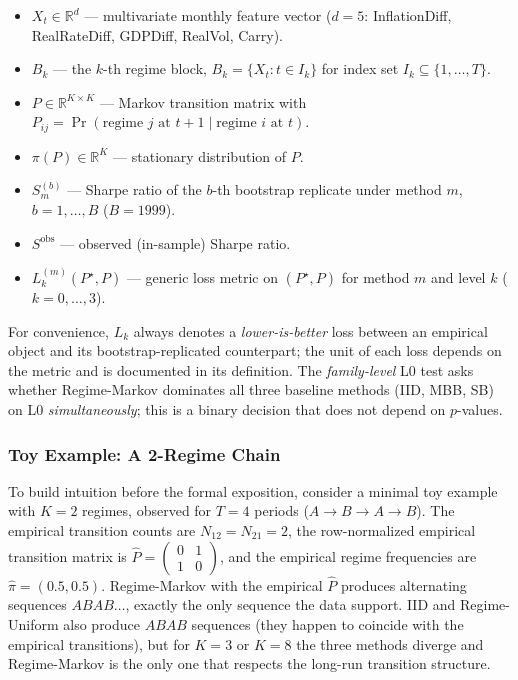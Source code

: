 \documentclass[11pt,a4paper]{article}
\theoremstyle{definition}
\begin{document}
\begin{itemize}[leftmargin=2em]
  \item $X_t \in \mathbb{R}^d$ --- multivariate monthly feature vector
        ($d=5$: InflationDiff, RealRateDiff, GDPDiff, RealVol, Carry).
  \item $B_k$ --- the $k$-th regime block, $B_k = \{X_t : t \in I_k\}$
        for index set $I_k \subseteq \{1, \ldots, T\}$.
  \item $P \in \mathbb{R}^{K \times K}$ --- Markov transition matrix
        with $P_{ij} = \Pr(\text{regime } j \text{ at } t+1 \mid \text{regime } i \text{ at } t)$.
  \item $\pi(P) \in \mathbb{R}^K$ --- stationary distribution of $P$.
  \item $S_m^{(b)}$ --- Sharpe ratio of the $b$-th bootstrap replicate
        under method $m$, $b = 1, \ldots, B$ ($B = 1999$).
  \item $S^{\text{obs}}$ --- observed (in-sample) Sharpe ratio.
  \item $L_k^{(m)}(P^{\star}, P)$ --- generic loss metric on
        $(P^{\star}, P)$ for method $m$ and level $k$ ($k = 0, \ldots, 3$).
\end{itemize}

For convenience, $L_k$ always denotes a \emph{lower-is-better} loss
between an empirical object and its bootstrap-replicated counterpart;
the unit of each loss depends on the metric and is documented in
its definition. The \emph{family-level} L0 test asks whether
Regime-Markov dominates all three baseline methods (IID, MBB, SB)
on L0 \emph{simultaneously}; this is a binary decision that does not
depend on $p$-values.

\subsubsection*{Toy Example: A 2-Regime Chain}

To build intuition before the formal exposition, consider a minimal
toy example with $K=2$ regimes, observed for $T = 4$ periods
($A \to B \to A \to B$). The empirical transition counts are
$N_{12} = N_{21} = 2$, the row-normalized empirical transition
matrix is $\hat P = \begin{pmatrix} 0 & 1 \\ 1 & 0 \end{pmatrix}$, and
the empirical regime frequencies are $\hat\pi = (0.5, 0.5)$.
Regime-Markov with the empirical $\hat P$ produces alternating
sequences $A B A B \ldots$, exactly the only sequence the data
support. IID and Regime-Uniform also produce $ABAB$ sequences
(they happen to coincide with the empirical transitions), but for
$K=3$ or $K=8$ the three methods diverge and Regime-Markov is the
only one that respects the long-run transition structure.
\end{document}

